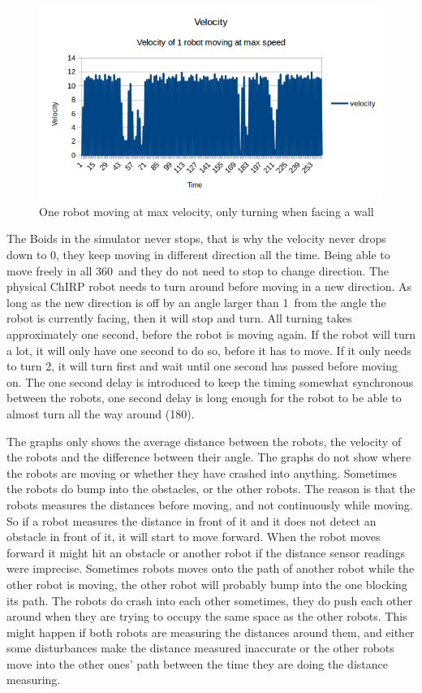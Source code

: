 \begin{figure}[h]
\begin{center}
\includegraphics[width=0.8\linewidth]{figs/speed}
\end{center}
\caption[Velocity of robot]{One robot moving at max velocity, only turning when facing a wall}
\label{fig:speed}
\end{figure}

The Boids in the simulator never stops, that is why the velocity never drops down to 0, they keep moving in different direction all the time. Being able to move freely in all 360\textdegree\ and they do not need to stop to change direction.
The physical ChIRP robot needs to turn around before moving in a new direction. As long as the new direction is off by an angle larger than 1\textdegree\ from the angle the robot is currently facing, then it will stop and turn. All turning takes approximately one second, before the robot is moving again. If the robot will turn a lot, it will only have one second to do so, before it has to move. If it only needs to turn 2\textdegree, it will turn first and wait until one second has passed before moving on.
The one second delay is introduced to keep the timing somewhat synchronous between the robots, one second delay is long enough for the robot to be able to almost turn all the way around (180\textdegree). 


The graphs only shows the average distance between the robots, the velocity of the robots and the difference between their angle. The graphs do not show where the robots are moving or whether they have crashed into anything.
Sometimes the robots do bump into the obstacles, or the other robots. The reason is that the robots measures the distances before moving, and not continuously while moving. 
So if a robot measures the distance in front of it and it does not detect an obstacle in front of it, it will start to move forward. When the robot moves forward it might hit an obstacle or another robot if the distance sensor readings were imprecise.
Sometimes robots moves onto the path of another robot while the other robot is moving, the other robot will probably bump into the one blocking its path.
The robots do crash into each other sometimes, they do push each other around when they are trying to occupy the same space as the other robots. This might happen if both robots are measuring the distances around them, and either some disturbances make the distance measured inaccurate or the other robots move into the other ones' path between the time they are doing the distance measuring. 

